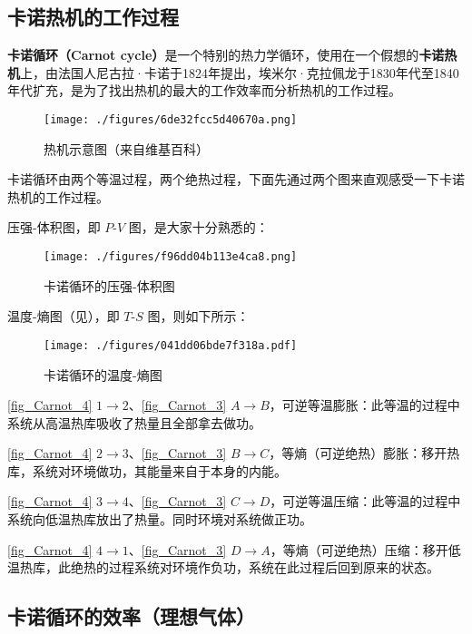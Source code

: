 


\subsection{卡诺热机的工作过程}
\textbf{卡诺循环（Carnot cycle）}是一个特别的热力学循环，使用在一个假想的\textbf{卡诺热机}上，由法国人尼古拉·卡诺于1824年提出，埃米尔·克拉佩龙于1830年代至1840年代扩充，是为了找出热机的最大的工作效率而分析热机的工作过程。

\begin{figure}[ht]
\centering
\texttt{[image: ./figures/6de32fcc5d40670a.png]}
\caption{热机示意图（来自维基百科）} \label{fig_Carnot_1}
\end{figure}
卡诺循环由两个等温过程，两个绝热过程，下面先通过两个图来直观感受一下卡诺热机的工作过程。

压强-体积图，即 $P$-$V$ 图，是大家十分熟悉的：

\begin{figure}[ht]
\centering
\texttt{[image: ./figures/f96dd04b113e4ca8.png]}
\caption{卡诺循环的压强-体积图} \label{fig_Carnot_4}
\end{figure}

温度-熵图（见），即 $T$-$S$ 图，则如下所示：
\begin{figure}[ht]
\centering
\texttt{[image: ./figures/041dd06bde7f318a.pdf]}
\caption{卡诺循环的温度-熵图} \label{fig_Carnot_3}
\end{figure}

\autoref{fig_Carnot_4} $1\to 2$、\autoref{fig_Carnot_3} $A\to B$，可逆等温膨胀：此等温的过程中系统从高温热库吸收了热量且全部拿去做功。

\autoref{fig_Carnot_4} $2\to 3$、\autoref{fig_Carnot_3} $B\to C$，等熵（可逆绝热）膨胀：移开热库，系统对环境做功，其能量来自于本身的内能。

\autoref{fig_Carnot_4} $3\to 4$、\autoref{fig_Carnot_3} $C\to D$，可逆等温压缩：此等温的过程中系统向低温热库放出了热量。同时环境对系统做正功。

\autoref{fig_Carnot_4} $4\to 1$、\autoref{fig_Carnot_3} $D\to A$，等熵（可逆绝热）压缩：移开低温热库，此绝热的过程系统对环境作负功，系统在此过程后回到原来的状态。

\subsection{卡诺循环的效率（理想气体）}

